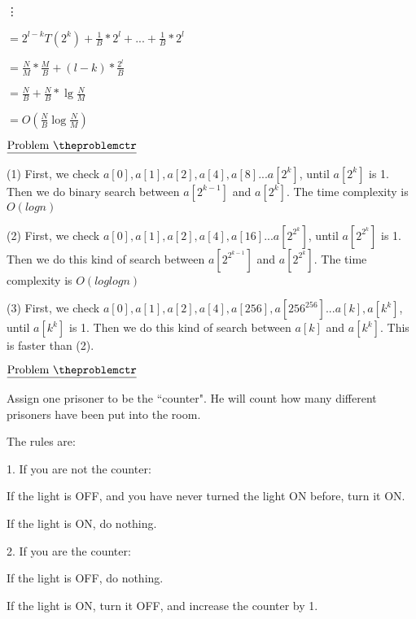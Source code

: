 \documentclass[11pt]{article}
\def\pp{\par\noindent}
\begin{document}
\hspace{1.5 cm} \vdots

\hspace{1.0 cm}$= 2^{l-k}T(2^{k})+\frac{1}{B}*2^{l}+...+\frac{1}{B}*2^{l}$

\hspace{1.0 cm}$= \frac{N}{M}*\frac{M}{B}+(l-k)*\frac{2^{l}}{B}$

\hspace{1.0 cm}$= \frac{N}{B}+\frac{N}{B}*\lg \frac{N}{M}$

\hspace{1.0 cm}$= O(\frac{N}{B}\log \frac{N}{M})$

\vfill
\newpage
\addtocounter{problemctr}{1}
\bigskip
\noindent
$\underline{\rm Problem\ \theproblemctr}$\pp

\noindent
(1) First, we check $a[0], a[1], a[2], a[4], a[8]...a[2^{k}]$, until $a[2^{k}]$ is 1. Then we do binary search between $a[2^{k-1}]$ and $a[2^{k}]$. The time complexity is $O(logn)$

\bigskip
\bigskip
\noindent
(2) First, we check $a[0], a[1], a[2], a[4], a[16]...a[2^{2^k}]$, until $a[2^{2^k}]$ is 1. Then we do this kind of search between $a[2^{2^{k-1}}]$ and $a[2^{2^k}]$. The time complexity is $O(loglogn)$

\bigskip
\bigskip
\noindent
(3) First, we check $a[0], a[1], a[2], a[4], a[256], a[256^256]...a[k], a[k^k]$, until $a[k^k]$ is 1. Then we do this kind of search between $a[k]$ and $a[k^k]$. This is faster than (2).

\vfill
\newpage
\addtocounter{problemctr}{1}
\bigskip
\noindent
$\underline{\rm Problem\ \theproblemctr}$

\noindent
Assign one prisoner to be the ``counter". He will count how many different prisoners have been put into the room.

\noindent
The rules are:

1. If you are not the counter:

   \hspace{1.0 cm}If the light is OFF, and you have never turned the light ON before, turn it ON.

   \hspace{1.0 cm}If the light is ON, do nothing.

2. If you are the counter:

   \hspace{1.0 cm}If the light is OFF, do nothing.

   \hspace{1.0 cm}If the light is ON, turn it OFF, and increase the counter by 1.
\end{document}

